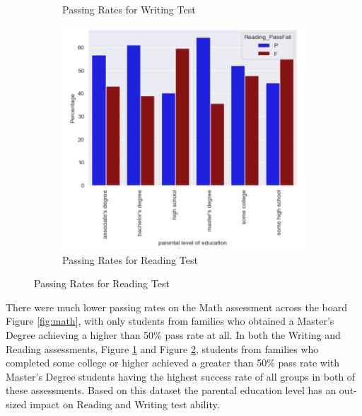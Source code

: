 \documentclass[doc]{apa6} %
\begin{document}
\begin{figure}[H]
\begin{subfigure}[b]{0.28\textwidth}
    \caption{Passing Rates for Writing Test}
    \label{fig:write}
    \end{subfigure}
    \begin{subfigure}[b]{0.28\textwidth}
    \includegraphics[width=\linewidth]{ReadingPFBarGraph.png}
    \caption{Passing Rates for Reading Test}
    \label{fig:read}
    \end{subfigure}
    \label{fig:PassRatesParentEdLevel}
\end{figure}

There were much lower passing rates on the Math assessment across the board Figure \ref{fig:math}, with only students from families who obtained a Master's Degree achieving a higher than 50\% pass rate at all. In both the Writing and Reading assessments, Figure \ref{fig:write} and Figure \ref{fig:read}, students from families who completed some college or higher achieved a greater than 50\% pass rate with Master's Degree students having the highest success rate of all groups in both of these assessments. Based on this dataset the parental education level has an out-sized impact on Reading and Writing test ability.
\end{document}
